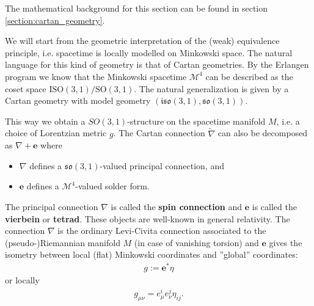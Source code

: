     The mathematical background for this section can be found in section \ref{section:cartan_geometry}.

    We will start from the geometric interpretation of the (weak) equivalence principle, i.e. spacetime is locally modelled on Minkowski space. The natural language for this kind of geometry is that of Cartan geometries. By the Erlangen program we know that the Minkowski spacetime $\mathcal{M}^4$ can be described as the coset space $\text{ISO}(3,1)/\text{SO}(3,1)$. The natural generalization is given by a Cartan geometry with model geometry $(\mathfrak{iso}(3,1), \mathfrak{so}(3,1))$.

    \begin{property}
        This way we obtain a $SO(3,1)$-structure on the spacetime manifold $M$, i.e. a choice of Lorentzian metric $g$. The Cartan connection $\widetilde{\nabla}$ can also be decomposed as $\nabla+\mathbf{e}$ where
        \begin{itemize}
            \item $\nabla$ defines a $\mathfrak{so}(3,1)$-valued principal connection, and
            \item $\mathbf{e}$ defines a $\mathcal{M}^4$-valued solder form.
        \end{itemize}
        The principal connection $\nabla$ is called the \textbf{spin connection} and $\mathbf{e}$ is called the \textbf{vierbein} or \textbf{tetrad}. These objects are well-known in general relativity. The connection $\nabla$ is the ordinary Levi-Civita connection associated to the (pseudo-)Riemannian manifold $M$ (in case of vanishing torsion) and $\mathbf{e}$ gives the isometry between local (flat) Minkowski coordinates and ''global'' coordinates:
        \begin{gather}
            g := \mathbf{e}^*\eta
        \end{gather}
        or locally
        \begin{gather}
            g_{\mu\nu} = e^i_\mu e^j_\nu\eta_{ij}.
        \end{gather}
    \end{property}

